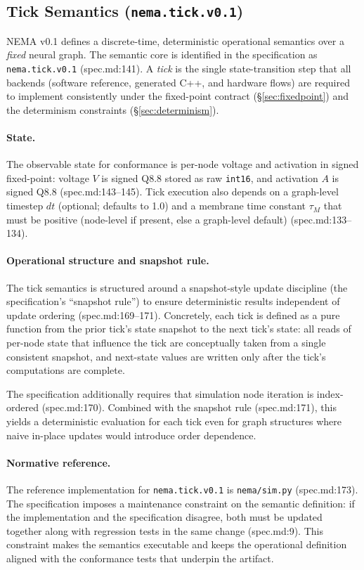 \subsection{Tick Semantics (\texttt{nema.tick.v0.1})}
NEMA v0.1 defines a discrete-time, deterministic operational semantics over a \emph{fixed} neural graph. The semantic core is identified in the specification as \texttt{nema.tick.v0.1} (spec.md:141). A \emph{tick} is the single state-transition step that all backends (software reference, generated C++, and hardware flows) are required to implement consistently under the fixed-point contract (§\ref{sec:fixedpoint}) and the determinism constraints (§\ref{sec:determinism}).

\paragraph{State.}
The observable state for conformance is per-node voltage and activation in signed fixed-point: voltage $V$ is signed Q8.8 stored as raw \texttt{int16}, and activation $A$ is signed Q8.8 (spec.md:143–145). Tick execution also depends on a graph-level timestep $dt$ (optional; defaults to 1.0) and a membrane time constant $\tau_M$ that must be positive (node-level if present, else a graph-level default) (spec.md:133–134).

\paragraph{Operational structure and snapshot rule.}
The tick semantics is structured around a snapshot-style update discipline (the specification’s “snapshot rule”) to ensure deterministic results independent of update ordering (spec.md:169–171). Concretely, each tick is defined as a pure function from the prior tick’s state snapshot to the next tick’s state: all reads of per-node state that influence the tick are conceptually taken from a single consistent snapshot, and next-state values are written only after the tick’s computations are complete.

The specification additionally requires that simulation node iteration is index-ordered (spec.md:170). Combined with the snapshot rule (spec.md:171), this yields a deterministic evaluation for each tick even for graph structures where naive in-place updates would introduce order dependence.

\paragraph{Normative reference.}
The reference implementation for \texttt{nema.tick.v0.1} is \texttt{nema/sim.py} (spec.md:173). The specification imposes a maintenance constraint on the semantic definition: if the implementation and the specification disagree, both must be updated together along with regression tests in the same change (spec.md:9). This constraint makes the semantics executable and keeps the operational definition aligned with the conformance tests that underpin the artifact.

